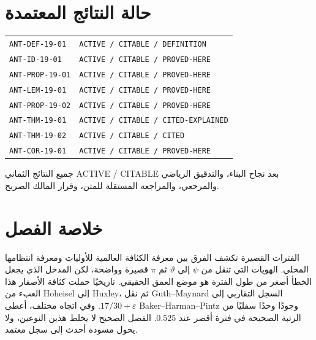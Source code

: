 \section*{حالة النتائج المعتمدة}

\begin{center}
\begin{tabular}{ll}
\texttt{ANT-DEF-19-01} & \texttt{ACTIVE / CITABLE / DEFINITION}\\
\texttt{ANT-ID-19-01} & \texttt{ACTIVE / CITABLE / PROVED-HERE}\\
\texttt{ANT-PROP-19-01} & \texttt{ACTIVE / CITABLE / PROVED-HERE}\\
\texttt{ANT-LEM-19-01} & \texttt{ACTIVE / CITABLE / PROVED-HERE}\\
\texttt{ANT-PROP-19-02} & \texttt{ACTIVE / CITABLE / PROVED-HERE}\\
\texttt{ANT-THM-19-01} & \texttt{ACTIVE / CITABLE / CITED-EXPLAINED}\\
\texttt{ANT-THM-19-02} & \texttt{ACTIVE / CITABLE / CITED}\\
\texttt{ANT-COR-19-01} & \texttt{ACTIVE / CITABLE / PROVED-HERE}
\end{tabular}
\end{center}

جميع النتائج الثماني \textenglish{ACTIVE / CITABLE} بعد نجاح البناء، والتدقيق الرياضي والمرجعي، والمراجعة المستقلة للمتن، وقرار المالك الصريح.

\section{خلاصة الفصل}

الفترات القصيرة تكشف الفرق بين معرفة الكثافة العالمية للأوليات ومعرفة انتظامها المحلي. الهويات التي تنقل من \(\psi\) إلى \(\vartheta\) ثم \(\pi\) قصيرة وواضحة، لكن المدخل الذي يجعل الخطأ أصغر من طول الفترة هو موضع العمق الحقيقي. تاريخيًا حملت كثافة الأصفار هذا العبء من Hoheisel إلى Huxley، ثم نقل Guth--Maynard السجل التقاربي إلى \(17/30+\varepsilon\). وفي اتجاه مختلف، أعطى Baker--Harman--Pintz وجودًا وحدًا سفليًا من الرتبة الصحيحة في فترة أقصر عند \(0.525\). الفصل الصحيح لا يخلط هذين النوعين، ولا يحول مسودة أحدث إلى سجل معتمد.
